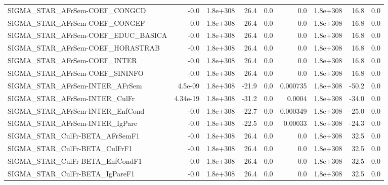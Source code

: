 \begin{tabular}{lrrrrrrrr}
SIGMA\_STAR\_AFrSem-COEF\_CONGCD         &        -0.0 &     1.8e+308 &    26.4 &      0.0 &        0.0 &    1.8e+308 &         16.8 &           0.0 \\
SIGMA\_STAR\_AFrSem-COEF\_CONGEF         &        -0.0 &     1.8e+308 &    26.4 &      0.0 &        0.0 &    1.8e+308 &         16.8 &           0.0 \\
SIGMA\_STAR\_AFrSem-COEF\_EDUC\_BASICA    &        -0.0 &     1.8e+308 &    26.4 &      0.0 &        0.0 &    1.8e+308 &         16.8 &           0.0 \\
SIGMA\_STAR\_AFrSem-COEF\_HORASTRAB      &        -0.0 &     1.8e+308 &    26.4 &      0.0 &        0.0 &    1.8e+308 &         16.8 &           0.0 \\
SIGMA\_STAR\_AFrSem-COEF\_INTER          &        -0.0 &     1.8e+308 &    26.4 &      0.0 &        0.0 &    1.8e+308 &         16.8 &           0.0 \\
SIGMA\_STAR\_AFrSem-COEF\_SININFO        &        -0.0 &     1.8e+308 &    26.4 &      0.0 &        0.0 &    1.8e+308 &         16.8 &           0.0 \\
SIGMA\_STAR\_AFrSem-INTER\_AFrSem        &     4.5e-09 &     1.8e+308 &   -21.9 &      0.0 &   0.000735 &    1.8e+308 &        -50.2 &           0.0 \\
SIGMA\_STAR\_AFrSem-INTER\_CulFr         &    4.34e-19 &     1.8e+308 &   -31.2 &      0.0 &     0.0004 &    1.8e+308 &        -34.0 &           0.0 \\
SIGMA\_STAR\_AFrSem-INTER\_EnfCond       &        -0.0 &     1.8e+308 &   -22.7 &      0.0 &   0.000349 &    1.8e+308 &        -25.0 &           0.0 \\
SIGMA\_STAR\_AFrSem-INTER\_IgPare        &        -0.0 &     1.8e+308 &   -22.5 &      0.0 &    0.00033 &    1.8e+308 &        -24.3 &           0.0 \\
SIGMA\_STAR\_CulFr-BETA\_AFrSemF1        &        -0.0 &     1.8e+308 &    26.4 &      0.0 &        0.0 &    1.8e+308 &         32.5 &           0.0 \\
SIGMA\_STAR\_CulFr-BETA\_CulFrF1         &        -0.0 &     1.8e+308 &    26.4 &      0.0 &        0.0 &    1.8e+308 &         32.5 &           0.0 \\
SIGMA\_STAR\_CulFr-BETA\_EnfCondF1       &        -0.0 &     1.8e+308 &    26.4 &      0.0 &        0.0 &    1.8e+308 &         32.5 &           0.0 \\
SIGMA\_STAR\_CulFr-BETA\_IgPareF1        &        -0.0 &     1.8e+308 &    26.4 &      0.0 &        0.0 &    1.8e+308 &         32.5 &           0.0 \\

\end{tabular}
